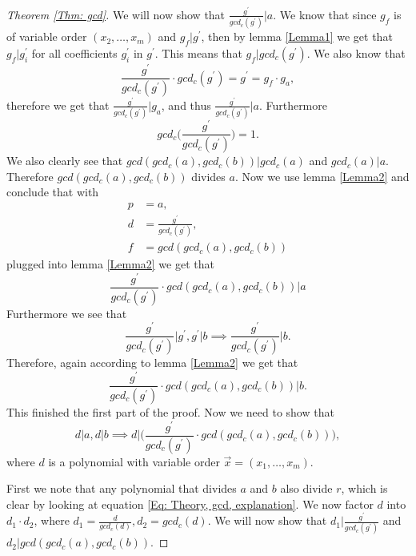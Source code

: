 \begin{proof}[Theorem \ref{Thm: gcd}]
  We will now show that $\frac{g^\prime}{gcd_c(g^\prime)}|a$. We know that since $g_f$ is of variable order $(x_2,\ldots,x_m)$ and $g_f|g^\prime$, then by lemma \ref{Lemma1} we get that $g_f|g_i^\prime$ for all coefficients $g_i^\prime$ in $g^\prime$. This means that $g_f|gcd_c(g^\prime)$. We also know that
  \begin{equation}
    \frac{g^\prime}{gcd_c(g^\prime)}\cdot gcd_c(g^\prime) = g^\prime = g_f\cdot g_a,
  \end{equation}
  therefore we get that $\frac{g^\prime}{gcd_c(g^\prime)}|g_a$, and thus $\frac{g^\prime}{gcd_c(g^\prime)}|a$. Furthermore
  \begin{equation}
    gcd_c\Big(\frac{g^\prime}{gcd_c(g^\prime)}\Big)=1.
  \end{equation}
  We also clearly see that $gcd(gcd_c(a),gcd_c(b))|gcd_c(a)$ and $gcd_c(a)|a$. Therefore $gcd(gcd_c(a),gcd_c(b))$ divides $a$. Now we use lemma \ref{Lemma2} and conclude that with
  \begin{equation}
    \begin{split}
      p&=a, \\
      d&=\frac{g^\prime}{gcd_c(g^\prime)}, \\
      f&=gcd(gcd_c(a),gcd_c(b))
    \end{split}
  \end{equation}
  plugged into lemma \ref{Lemma2} we get that
  \begin{equation}
    \frac{g^\prime}{gcd_c(g^\prime)}\cdot gcd(gcd_c(a),gcd_c(b)) | a
  \end{equation}
  Furthermore we see that
  \begin{equation}
    \frac{g^\prime}{gcd_c(g^\prime)}\Big|g^\prime,g^\prime|b \implies \frac{g^\prime}{gcd_c(g^\prime)}\Big|b.
  \end{equation}
  Therefore, again according to lemma \ref{Lemma2} we get that
  \begin{equation}
    \frac{g^\prime}{gcd_c(g^\prime)}\cdot gcd(gcd_c(a),gcd_c(b)) | b.
  \end{equation}
  This finished the first part of the proof. Now we need to show that
  \begin{equation}
    d|a,d|b\implies d\Big|\Big(\frac{g^\prime}{gcd_c(g^\prime)}\cdot gcd(gcd_c(a),gcd_c(b))\Big),
  \end{equation}
  where $d$ is a polynomial with variable order $\vec{x}=(x_1,\ldots,x_m)$.

  First we note that any polynomial that divides $a$ and $b$ also divide $r$, which is clear by looking at equation \ref{Eq: Theory, gcd, explanation}. We now factor $d$ into $d_1\cdot d_2$, where $d_1=\frac{d}{gcd_c(d)}, d_2=gcd_c(d)$. We will now show that $d_1|\frac{g^\prime}{gcd_c(g^\prime)}$ and $d_2|gcd(gcd_c(a),gcd_c(b))$.


\end{proof}
